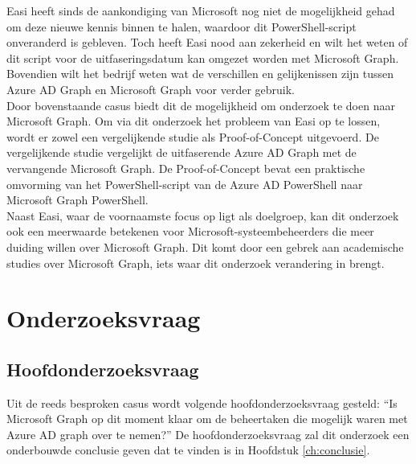 Easi heeft sinds de aankondiging van Microsoft nog niet de mogelijkheid gehad om deze nieuwe kennis binnen te halen, waardoor dit PowerShell-script onveranderd is gebleven. Toch heeft Easi nood aan zekerheid en wilt het weten of dit script voor de uitfaseringsdatum kan omgezet worden met Microsoft Graph. Bovendien wilt het bedrijf weten wat de verschillen en gelijkenissen zijn tussen Azure \ac{AD} Graph en Microsoft Graph voor verder gebruik. \\

Door bovenstaande casus biedt dit de mogelijkheid om onderzoek te doen naar Microsoft Graph. Om via dit onderzoek het probleem van Easi op te lossen, wordt er zowel een vergelijkende studie als Proof-of-Concept uitgevoerd. De vergelijkende studie vergelijkt de uitfaserende Azure \Ac{AD} Graph met de vervangende Microsoft Graph. De Proof-of-Concept bevat een praktische omvorming van het PowerShell-script van de Azure \Ac{AD} PowerShell naar Microsoft Graph PowerShell. \\

Naast Easi, waar de voornaamste focus op ligt als doelgroep, kan dit onderzoek ook een meerwaarde betekenen voor Microsoft-systeembeheerders die meer duiding willen over Microsoft Graph. Dit komt door een gebrek aan academische studies over Microsoft Graph, iets waar dit onderzoek verandering in brengt. 

\section{Onderzoeksvraag}
\label{sec:onderzoeksvraag}

\begin{comment}
Wees zo concreet mogelijk bij het formuleren van je onderzoeksvraag. Een onderzoeksvraag is trouwens iets waar nog niemand op dit moment een antwoord heeft (voor zover je kan nagaan). Het opzoeken van bestaande informatie (bv. ``welke tools bestaan er voor deze toepassing?'') is dus geen onderzoeksvraag. Je kan de onderzoeksvraag verder specifiëren in deelvragen. Bv.~als je onderzoek gaat over performantiemetingen, dan 
\end{comment}

\subsection{Hoofdonderzoeksvraag}

Uit de reeds besproken casus wordt volgende hoofdonderzoeksvraag gesteld: “Is Microsoft Graph op dit moment klaar om de beheertaken die mogelijk waren met Azure AD graph over te nemen?” De hoofdonderzoeksvraag zal dit onderzoek een onderbouwde conclusie geven dat te vinden is in Hoofdstuk \ref{ch:conclusie}.

